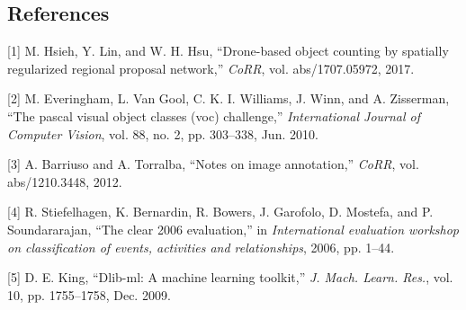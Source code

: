 \documentclass[]{article}
\theoremstyle{definition}
\theoremstyle{definition}
\theoremstyle{definition}
\theoremstyle{remark}
\begin{document}
\hypertarget{references}{%
\subsection*{References}\label{references}}

\hypertarget{refs}{}
\leavevmode\hypertarget{ref-DBLP:journalsux2fcorrux2fHsiehLH17}{}%
{[}1{]} M. Hsieh, Y. Lin, and W. H. Hsu, ``Drone-based object counting
by spatially regularized regional proposal network,'' \emph{CoRR}, vol.
abs/1707.05972, 2017.

\leavevmode\hypertarget{ref-Everingham10}{}%
{[}2{]} M. Everingham, L. Van Gool, C. K. I. Williams, J. Winn, and A.
Zisserman, ``The pascal visual object classes (voc) challenge,''
\emph{International Journal of Computer Vision}, vol. 88, no. 2, pp.
303--338, Jun. 2010.

\leavevmode\hypertarget{ref-DBLP:journalsux2fcorrux2fabs-1210-3448}{}%
{[}3{]} A. Barriuso and A. Torralba, ``Notes on image annotation,''
\emph{CoRR}, vol. abs/1210.3448, 2012.

\leavevmode\hypertarget{ref-stiefelhagen2006clear}{}%
{[}4{]} R. Stiefelhagen, K. Bernardin, R. Bowers, J. Garofolo, D.
Mostefa, and P. Soundararajan, ``The clear 2006 evaluation,'' in
\emph{International evaluation workshop on classification of events,
activities and relationships}, 2006, pp. 1--44.

\leavevmode\hypertarget{ref-King:2009:DML:1577069.1755843}{}%
{[}5{]} D. E. King, ``Dlib-ml: A machine learning toolkit,'' \emph{J.
Mach. Learn. Res.}, vol. 10, pp. 1755--1758, Dec. 2009.
\end{document}
